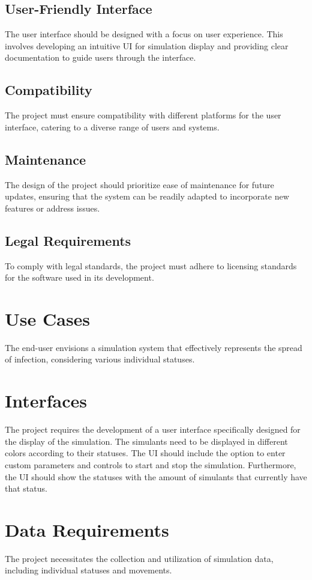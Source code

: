 \documentclass{article}
\begin{document}
	\subsection{User-Friendly Interface}
	The user interface should be designed with a focus on user experience. This involves developing an intuitive UI for simulation display and providing clear documentation to guide users through the interface.
	
	\subsection{Compatibility}
	The project must ensure compatibility with different platforms for the user interface, catering to a diverse range of users and systems.
	
	\subsection{Maintenance}
	The design of the project should prioritize ease of maintenance for future updates, ensuring that the system can be readily adapted to incorporate new features or address issues.
	
	\subsection{Legal Requirements}
	To comply with legal standards, the project must adhere to licensing standards for the software used in its development.
	
	\section{Use Cases}
	The end-user envisions a simulation system that effectively represents the spread of infection, considering various individual statuses.
	
	\section{Interfaces}
	The project requires the development of a user interface specifically designed for the display of the simulation. The simulants need to be displayed in different colors according to their statuses. The UI should include the option to enter custom parameters and controls to start and stop the simulation. Furthermore, the UI should show the statuses with the amount of simulants that currently have that status.
	
	\section{Data Requirements}
	The project necessitates the collection and utilization of simulation data, including individual statuses and movements.
	
\end{document}
